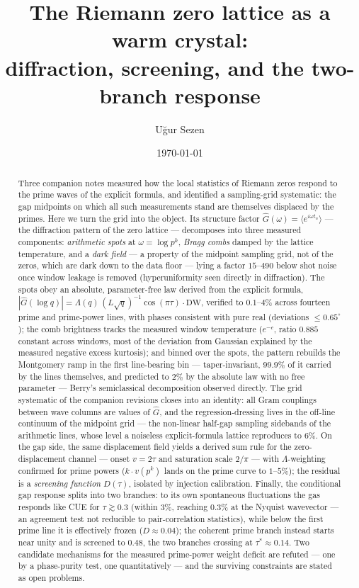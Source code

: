 \documentclass[12pt]{amsart}
\title[The Riemann zero lattice as a warm crystal]{The Riemann zero
lattice as a warm crystal:\\ diffraction, screening, and the two-branch
response}
\author{U\u{g}ur Sezen}
\date{\today}
\begin{document}
\begin{abstract}
Three companion notes measured how the local statistics of Riemann zeros
respond to the prime waves of the explicit formula, and identified a
sampling-grid systematic: the gap midpoints on which all such
measurements stand are themselves displaced by the primes. Here we turn
the grid into the object. Its structure factor
$\hat G(\omega) = \langle e^{i\omega t_n}\rangle$ --- the diffraction
pattern of the zero lattice --- decomposes into three measured
components: \emph{arithmetic spots} at $\omega = \log p^k$,
\emph{Bragg combs} damped by the lattice temperature, and a
\emph{dark field} --- a property of the midpoint sampling grid, not of
the zeros, which are dark down to the data floor --- lying a factor
$15$--$490$ below shot noise once window leakage is removed
(hyperuniformity seen directly in diffraction). The spots obey an
absolute, parameter-free law derived from the explicit formula,
$|\hat G(\log q)| = \Lambda(q)\,(L\sqrt{q})^{-1}\cos(\pi\tau)
\cdot \mathrm{DW}$, verified to $0.1$--$4\%$ across fourteen prime and
prime-power lines, with phases consistent with pure real (deviations $\le 0.65^\circ$); the comb
brightness tracks the measured window temperature ($e^{-c}$, ratio
$0.885$ constant across windows, most of the deviation from Gaussian
explained by the measured negative excess kurtosis); and binned over
the spots, the pattern rebuilds the Montgomery ramp in the first
line-bearing bin --- taper-invariant, $99.9\%$ of it carried by the
lines themselves, and predicted to $2\%$ by the absolute law with no
free parameter --- Berry's semiclassical decomposition observed
directly. The grid systematic of the companion revisions closes into an
identity: all Gram couplings between wave columns are values of
$\hat G$, and the regression-dressing lives in the off-line continuum
of the midpoint grid --- the non-linear half-gap sampling sidebands of
the arithmetic lines, whose level a noiseless explicit-formula lattice
reproduces to $6\%$. On the gap side, the
same displacement field yields a derived sum rule for the
zero-displacement channel --- onset $v = 2\tau$ and saturation scale
$2/\pi$ --- with $\Lambda$-weighting confirmed for prime powers
($k \cdot v(p^k)$ lands on the prime curve to $1$--$5\%$); the residual
is a \emph{screening function} $D(\tau)$, isolated by injection
calibration. Finally, the conditional gap response splits into two
branches: to its own spontaneous fluctuations the gas responds like CUE for
$\tau \gtrsim 0.3$ (within $3\%$, reaching $0.3\%$ at the Nyquist
wavevector --- an agreement test not reducible to pair-correlation
statistics), while below the first prime line it is effectively frozen
($D \approx 0.04$); the coherent prime branch instead starts near unity
and is screened to $0.48$, the two branches crossing at
$\tau^* \approx 0.14$. Two candidate mechanisms for the measured prime-power weight deficit
are refuted --- one by a phase-purity test, one quantitatively --- and
the surviving constraints are stated as open problems.
\end{abstract}
\end{document}
